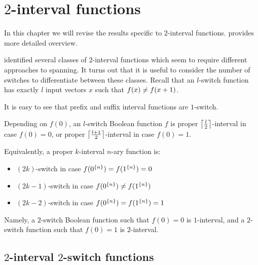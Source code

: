 \chapter{\texorpdfstring{$2$}{2}-interval functions}
\label{chap:2interval}

In this chapter we will revise the results specific to
$2$-interval functions.
\citet{Dubovsky2012}
provides more detailed overview.

\citeauthor{Dubovsky2012} identified several classes
of $2$-interval functions \citep[p.~5]{Dubovsky2012}
which seem to require different approaches to spanning.
It turns out that it is useful to consider
the number of switches
to differentiate between these classes.
Recall that an $l$-switch function has exactly $l$ input
vectors $x$ such that $\apply{f}{x} \neq \apply{f}{x+1}$.

It is easy to see that
prefix and suffix interval functions are $1$-switch.

Depending on $f(0)$,
an $l$-switch Boolean function $f$
is proper $\ceil*{\frac{l}{2}}$-interval
in case $f(0) = 0$,
or proper $\ceil*{\frac{l+1}{2}}$-interval
in case $f(0) = 1$.

Equivalently,
a proper $k$-interval $n$-ary function is:

\begin{itemize}
\item
$(2k)$-switch in case $f(\rep{0}{n}) = f(\rep{1}{n}) = 0$
\item
$(2k-1)$-switch in case $f(\rep{0}{n}) \neq f(\rep{1}{n})$
\item
$(2k-2)$-switch in case $f(\rep{0}{n}) = f(\rep{1}{n}) = 1$
\end{itemize}

Namely,
a $2$-switch Boolean function such that $f(0) = 0$
is $1$-interval,
and a $2$-switch function such that $f(0) = 1$
is $2$-interval.

\section{\texorpdfstring{$2$}{2}-interval
\texorpdfstring{$2$}{2}-switch functions}
\label{sec:2int2switch}

\newcommand{\ftwointtwoswitch}[4]
{#1^{#2}_{\interval{\rep{0}{#2}}{#3},
\interval{#4}{\rep{1}{#2}}}}

